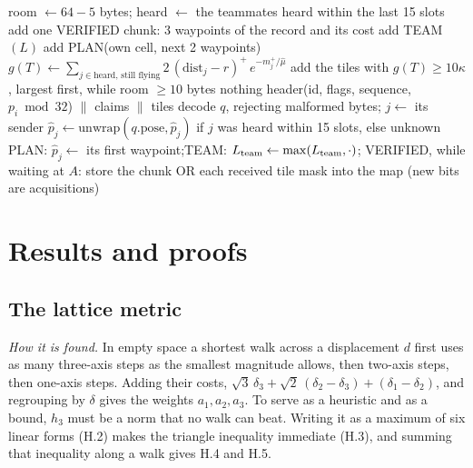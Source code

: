 \documentclass[11pt,a4paper]{article}
\begin{document}
\begin{algorithm}[htbp]
\caption{\textsc{SelectAndSend} (step 7) and \textsc{Receive} (step 2)}\label{alg:send}
\begin{algorithmic}[1]
  \State room $\gets64-5$ bytes;\; heard $\gets$ the teammates heard within the last 15 slots
     add one VERIFIED chunk: 3 waypoints of the record and its cost \EndIf
     add TEAM$(L)$ \EndIf
     add PLAN(own cell, next 2 waypoints) \EndIf
      \State $g(T)\gets\sum_{j\in\text{heard, still flying}}2\,(\mathrm{dist}_j-r)^+\,e^{-m_j^+/\hat\mu}$
    \EndFor
    \State add the tiles with $g(T)\ge10\kappa$, largest first, while room $\ge10$ bytes
  \EndIf
   \Return nothing \EndIf
  \State \Return header(id, flags, sequence, $p_i\bmod32$) $\|$ claims $\|$ tiles 
\EndFunction
{}
  \State decode $q$, rejecting malformed bytes;\; $j\gets$ its sender
  \State $\hat p_j\gets\mathrm{unwrap}(q.\mathrm{pose},\hat p_j)$ if $j$ was heard within 15 slots, else unknown
  \State PLAN: $\hat p_j\gets$ its first waypoint;\quad TEAM: $L_{\rm team}\gets\max(L_{\rm team},\cdot)$;\quad
  VERIFIED, while waiting at $A$: store the chunk
  \State OR each received tile mask into the map (new bits are acquisitions) 
\EndFunction
\end{algorithmic}
\end{algorithm}

\section{Results and proofs}\label{sec:results}

\subsection{The lattice metric}

\noindent\emph{How it is found.} In empty space a shortest walk across a displacement $d$ first uses as many three-axis steps as the smallest
magnitude allows, then two-axis steps, then one-axis steps. Adding their costs, $\sqrt3\,\delta_3+\sqrt2\,(\delta_2-\delta_3)
+(\delta_1-\delta_2)$, and regrouping by $\delta$ gives the weights $a_1,a_2,a_3$. To serve as a heuristic and as a bound,
$h_3$ must be a norm that no walk can beat. Writing it as a maximum of six linear forms (H.2) makes the triangle
inequality immediate (H.3), and summing that inequality along a walk gives H.4 and H.5.
\end{document}
